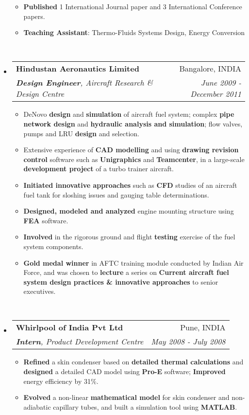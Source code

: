 \documentclass[letterpaper,11pt]{article}
\makeatletter
\newcommand{\resitem}[1]{\item #1 \vspace{-2pt}}
\newcommand{\ressubheading}[4]{
\begin{tabular*}{7.0in}{l@{\extracolsep{\fill}}r}
		\textbf{#1} & #2 \\
		\textit{#3} & \textit{#4} \\
\end{tabular*}\vspace{-6pt}}
\makeatother
\begin{document}
\begin{itemize}
\begin{itemize}
		      \resitem{{\small \textbf{Published} 1 International Journal paper and 3 International Conference papers.}}
		      \resitem{{\small \textbf{Teaching Assistant}: Thermo-Fluids Systems Design, Energy Conversion}}
	      \end{itemize} ~\\ \vspace{-10pt}
	\item
	      \ressubheading{Hindustan Aeronautics Limited}{Bangalore, INDIA}{\textbf{Design Engineer}, Aircraft Research \& Design Centre}{June 2009 - December 2011}
	      \begin{itemize}
		      \resitem{\small {DeNovo \textbf{design} and \textbf{simulation} of aircraft fuel system; complex \textbf{pipe network design} and \textbf{hydraulic analysis and simulation}; flow valves, pumps and LRU \textbf{design} and selection.}}
		      \resitem{{\small Extensive experience of \textbf{CAD modelling} and using \textbf{drawing revision control} software such as \textbf{Unigraphics} and \textbf{Teamcenter}, in a large-scale \textbf{development project} of a turbo trainer aircraft.}}
		      \resitem{{\small \textbf{Initiated innovative approaches} such as \textbf{CFD} studies of an aircraft fuel tank for sloshing issues and gauging table determinations.}}
		      \resitem{{\small \textbf{Designed, modeled and analyzed} engine mounting structure using \textbf{FEA} software.}}
		      \resitem{{\small \textbf{Involved} in the rigorous ground and flight \textbf{testing} exercise of the fuel system components.}}
		      \resitem{{\small \textbf{Gold medal winner} in AFTC training module conducted by Indian Air Force, and was chosen to \textbf{lecture} a series on \textbf{Current aircraft fuel system design practices \& innovative approaches} to senior executives.}}
	      \end{itemize} ~\\ \vspace{-10pt}
	\item
	      \ressubheading{Whirlpool of India Pvt Ltd}{Pune, INDIA}{\textbf{Intern}, Product Development Centre}{May 2008 - July 2008}
	      \begin{itemize}
		      \resitem{{\small \textbf{Refined} a skin condenser based on \textbf{detailed thermal calculations} and \textbf{designed} a detailed CAD model using \textbf{Pro-E} software; \textbf{Improved} energy efficiency by 31\%.}}
		      \resitem{{\small \textbf{Evolved} a non-linear \textbf{mathematical model} for skin condenser and non-adiabatic capillary tubes, and built a simulation tool using \textbf{MATLAB}.}}
	      \end{itemize}
\end{itemize}
\end{document}
